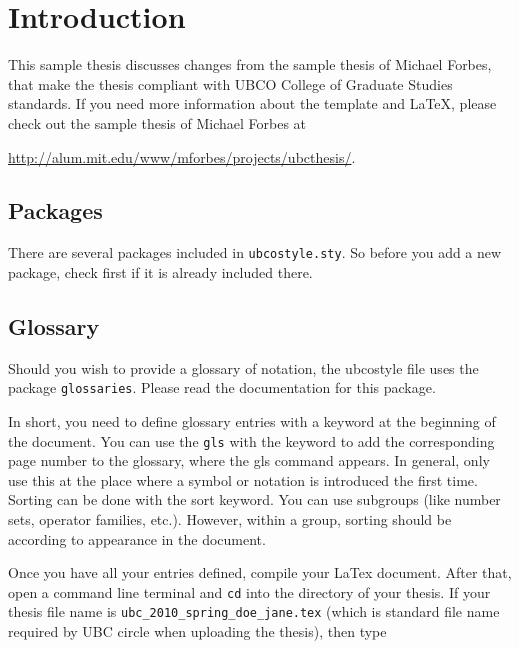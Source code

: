 \chapter{Introduction}

This sample thesis discusses changes from the
sample thesis of Michael Forbes, that make the thesis
compliant with UBCO College of Graduate Studies
standards. If you need more information about the template and LaTeX,
please check out the sample thesis of Michael Forbes at

\href{http://alum.mit.edu/www/mforbes/projects/ubcthesis/}{http://alum.mit.edu/www/mforbes/projects/ubcthesis/}.

\cite{MR2848848,MR2461448,MR2834159,infconv,convmono,MR2668638,Bauschke:2007-PA02,proxbas}

\section{Packages}

There are several packages included in
\texttt{ubcostyle.sty}. So before you add a new package, check first
if it is already included there.

\section{Glossary}

Should you wish to provide a glossary of notation, the ubcostyle file
uses the package \texttt{glossaries}. Please read the documentation
for this package.

In short, you need to define glossary entries with a keyword at the beginning of the document. You can use the \texttt{gls} with the keyword to add the corresponding page number to the glossary, where the gls command appears. In general, only use this at the place where a symbol or notation is introduced the first time. Sorting can be done with the sort keyword. You can use subgroups (like number sets, operator families, etc.). However, within a group, sorting should be according to appearance in the document.

Once you have all your entries defined, compile your LaTex document. After that, open a command line terminal and \texttt{cd} into the directory of your thesis. If your thesis file name is \texttt{ubc\_2010\_spring\_doe\_jane.tex} (which is standard file name required by UBC circle when uploading the thesis), then type

